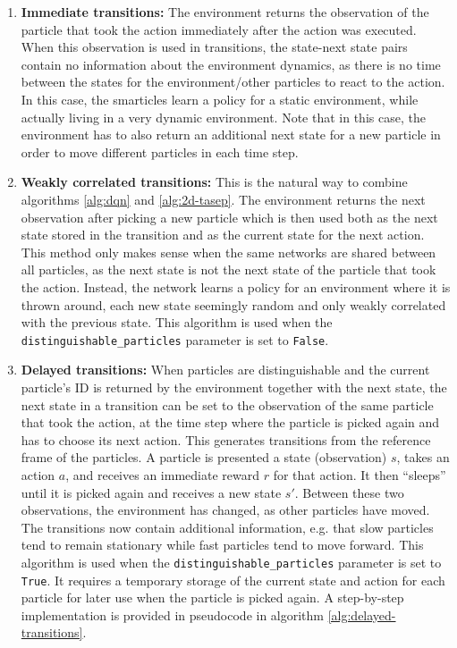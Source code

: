 \begin{enumerate}
    \item \textbf{Immediate transitions:} The environment returns the observation of the particle that took the action immediately after the action was executed. When this observation is used in transitions, the state-next state pairs contain no information about the environment dynamics, as there is no time between the states for the environment/other particles to react to the action. In this case, the smarticles learn a policy for a static environment, while actually living in a very dynamic environment. Note that in this case, the environment has to also return an additional next state for a new particle in order to move different particles in each time step.
    \item \textbf{Weakly correlated transitions:} This is the natural way to combine algorithms \ref{alg:dqn} and \ref{alg:2d-tasep}. The environment returns the next observation after picking a new particle which is then used both as the next state stored in the transition and as the current state for the next action. This method only makes sense when the same networks are shared between all particles, as the next state is not the next state of the particle that took the action. Instead, the network learns a policy for an environment where it is thrown around, each new state seemingly random and only weakly correlated with the previous state. This algorithm is used when the \texttt{distinguishable\_particles} parameter is set to \texttt{False}.
    \item \textbf{Delayed transitions:} When particles are distinguishable and the current particle's ID is returned by the environment together with the next state, the next state in a transition can be set to the observation of the same particle that took the action, at the time step where the particle is picked again and has to choose its next action. This generates transitions from the reference frame of the particles. A particle is presented a state (observation) $s$, takes an action $a$, and receives an immediate reward $r$ for that action. It then \enquote{sleeps} until it is picked again and receives a new state $s'$. Between these two observations, the environment has changed, as other particles have moved. The transitions now contain additional information, e.g. that slow particles tend to remain stationary while fast particles tend to move forward. This algorithm is used when the \texttt{distinguishable\_particles} parameter is set to \texttt{True}. It requires a temporary storage of the current state and action for each particle for later use when the particle is picked again. A step-by-step implementation is provided in pseudocode in algorithm \ref{alg:delayed-transitions}.
\end{enumerate}

